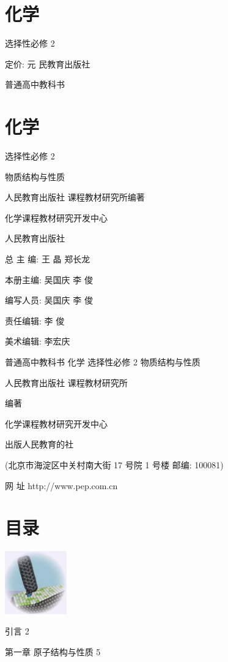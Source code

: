 \documentclass[10pt]{article}
\begin{document}
\section*{化学}

选择性必修 2

定价: 元 民教育出版社

普通高中教科书

\section*{化学}

选择性必修 2

物质结构与性质

人民教育出版社 课程教材研究所编著

化学课程教材研究开发中心

人民教育出版社

总 主 编: 王 晶 郑长龙

本册主编: 吴国庆 李 俊

编写人员: 吴国庆 李 俊

责任编辑: 李 俊

美术编辑: 李宏庆

普通高中教科书 化学 选择性必修 2 物质结构与性质

人民教育出版社 课程教材研究所

编著

化学课程教材研究开发中心

出版人民教育的社

(北京市海淀区中关村南大街 17 号院 1 号楼 邮编: 100081)

网 址 http://www.pep.com.cn

\section*{目录}

\begin{center}
\includegraphics[max width=0.2\textwidth]{images/0190e026-5a11-7df7-bd27-54d09026ba7a_4_281964.jpg}
\end{center}

引言 2

第一章 原子结构与性质 5
\end{document}
